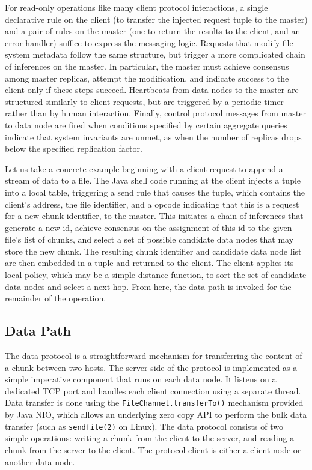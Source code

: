 \documentclass[twocolumn]{article}
\begin{document}
For read-only operations like many client protocol interactions, a
single declarative rule on the client (to transfer the injected
request tuple to the master) and a pair of rules on the master (one to
return the results to the client, and an error handler) suffice to
express the messaging logic.  Requests that modify file system
metadata follow the same structure, but trigger a more complicated
chain of inferences on the master.  In particular, the master must
achieve consensus among master replicas, attempt the modification, and
indicate success to the client only if these steps succeed.
Heartbeats from data nodes to the master are structured similarly to
client requests, but are triggered by a periodic timer rather than by
human interaction.  Finally, control protocol messages from master to
data node are fired when conditions specified by certain aggregate
queries indicate that system invariants are unmet, as when the number
of replicas drops below the specified replication factor.

Let us take a concrete example beginning with a client request to
append a stream of data to a file.  The Java shell code running at the
client injects a tuple into a local table, triggering a send rule that
causes the tuple, which contains the client's address, the file
identifier, and a opcode indicating that this is a request for a new
chunk identifier, to the master.  This initiates a chain of inferences
that generate a new id, achieve consensus on the assignment of this id
to the given file's list of chunks, and select a set of possible
candidate data nodes that may store the new chunk.  The resulting
chunk identifier and candidate data node list are then embedded in a
tuple and returned to the client.  The client applies its local
policy, which may be a simple distance function, to sort the set of
candidate data nodes and select a next hop.  From here, the data path
is invoked for the remainder of the operation.

\subsection{Data Path}
The data protocol is a straightforward mechanism for transferring the
content of a chunk between two hosts. The server side of the protocol
is implemented as a simple imperative component that runs on each data
node. It listens on a dedicated TCP port and handles each client
connection using a separate thread. Data transfer is done using the
\texttt{FileChannel.transferTo()} mechanism provided by Java NIO,
which allows an underlying zero copy API to perform the bulk data
transfer (such as \texttt{sendfile(2)} on Linux). The data protocol
consists of two simple operations: writing a chunk from the client to
the server, and reading a chunk from the server to the client. The
protocol client is either a client node or another data node.
\end{document}

